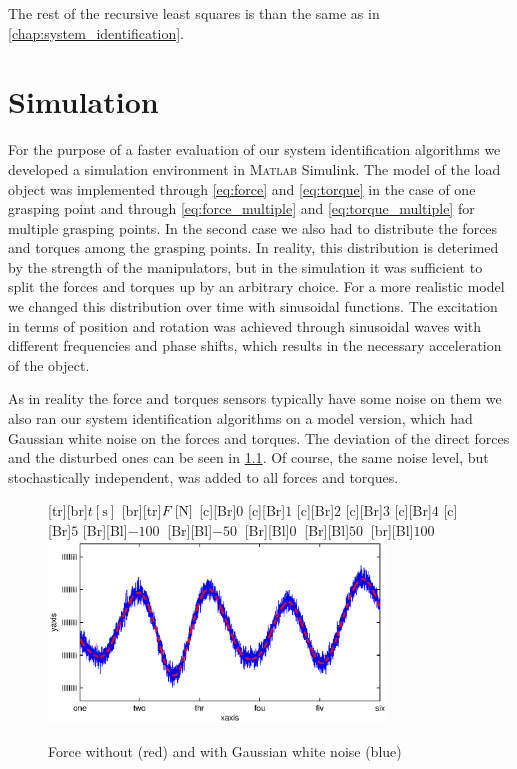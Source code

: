 The rest of the recursive least squares is than the same as in \ref{chap:system_identification}.

\chapter{Simulation}
\label{chap:simulation}
For the purpose of a faster evaluation of our system identification algorithms we developed a simulation environment in \textsc{Matlab} Simulink. The model of the load object was implemented through \ref{eq:force} and \ref{eq:torque} in the case of one grasping point and through \ref{eq:force_multiple} and \ref{eq:torque_multiple} for multiple grasping points. In the second case we also had to distribute the forces and torques among the grasping points. In reality, this distribution is deterimed by the strength of the manipulators, but in the simulation it was sufficient to split the forces and torques up by an arbitrary choice. For a more realistic model we changed this distribution over time with sinusoidal functions. The excitation in terms of position and rotation was achieved through sinusoidal waves with different frequencies and phase shifts, which results in the necessary acceleration of the object.

As in reality the force and torques sensors typically have some noise on them we also ran our system identification algorithms on a model version, which had Gaussian white noise on the forces and torques. The deviation of the direct forces and the disturbed ones can be seen in \ref{fig:force_noisy}. Of course, the same noise level, but stochastically independent, was added to all forces and torques.

\begin{figure}
	\centering	
	[tr][br]{$t\left[\mathrm{s}\right]$}
	[br][tr]{$F\left[\mathrm{N}\right]$}
	[Br]{$0$}
	[Br]{$1$}
	[Br]{$2$}
	[Br]{$3$}
	[Br]{$4$}
	[Br]{$5$}
	[Br][Bl]{$-100\  $}
	[Br][Bl]{$-50\  $}
	[Br][Bl]{$0\  $}
	[Br][Bl]{$50\  $}
	[br][Bl]{$100\  $}
	\includegraphics[width=0.8\textwidth]{figures/forces.eps}
	\vspace{0.2cm}
	\caption[Forces with noise]{Force without (red) and with Gaussian white noise (blue)}
	\label{fig:force_noisy}
\end{figure}

